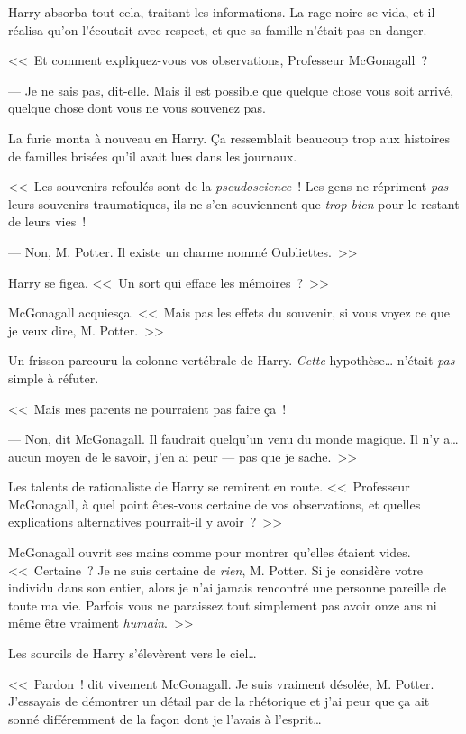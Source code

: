Harry absorba tout cela, traitant les informations. La rage noire se vida, et il réalisa qu'on l'écoutait avec respect, et que sa famille n'était pas en danger.

<<~Et comment expliquez-vous vos observations, Professeur McGonagall~?

--- Je ne sais pas, dit-elle. Mais il est possible que quelque chose vous soit arrivé, quelque chose dont vous ne vous souvenez pas.

La furie monta à nouveau en Harry. Ça ressemblait beaucoup trop aux histoires de familles brisées qu'il avait lues dans les journaux.

<<~Les souvenirs refoulés sont de la \emph{pseudoscience}~! Les gens ne répriment \emph{pas} leurs souvenirs traumatiques, ils ne s'en souviennent que \emph{trop bien} pour le restant de leurs vies~!

--- Non, M. Potter. Il existe un charme nommé Oubliettes.~>>

Harry se figea. <<~Un sort qui efface les mémoires~?~>>

McGonagall acquiesça. <<~Mais pas les effets du souvenir, si vous voyez ce que je veux dire, M. Potter.~>>

Un frisson parcouru la colonne vertébrale de Harry. \emph{Cette} hypothèse… n'était \emph{pas} simple à réfuter.

<<~Mais mes parents ne pourraient pas faire ça~!

--- Non, dit McGonagall. Il faudrait quelqu'un venu du monde magique. Il n'y a… aucun moyen de le savoir, j'en ai peur — pas que je sache.~>>

Les talents de rationaliste de Harry se remirent en route. <<~Professeur McGonagall, à quel point êtes-vous certaine de vos observations, et quelles explications alternatives pourrait-il y avoir~?~>>

McGonagall ouvrit ses mains comme pour montrer qu'elles étaient vides. <<~Certaine~? Je ne suis certaine de \emph{rien}, M. Potter. Si je considère votre individu dans son entier, alors je n'ai jamais rencontré une personne pareille de toute ma vie. Parfois vous ne paraissez tout simplement pas avoir onze ans ni même être vraiment \emph{humain}.~>>

Les sourcils de Harry s'élevèrent vers le ciel…

<<~Pardon~! dit vivement McGonagall. Je suis vraiment désolée, M. Potter. J'essayais de démontrer un détail par de la rhétorique et j'ai peur que ça ait sonné différemment de la façon dont je l'avais à l'esprit…

